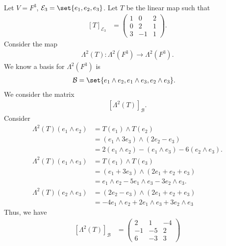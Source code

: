 \documentclass[10pt]{mypackage}
\begin{document}
    \begin{example}
      Let $V = F^3$, $\mathcal{E}_3 = \set{e_1,e_2,e_3}$. Let $T$ be the linear map such that
      \begin{align*}
        \left[T\right]_{\mathcal{E}_3} &= \begin{pmatrix}1 & 0 & 2 \\ 0 & 2 &1 \\ 3 & -1 & 1\end{pmatrix}.
      \end{align*}
      Consider the map
      \begin{align*}
        \Lambda^{2}\left(T\right): \Lambda^{2}\left(F^3\right)\rightarrow \Lambda^{2}\left(F^3\right).
      \end{align*}
      We know a basis for $\Lambda^{2}\left(F^3\right)$ is
      \begin{align*}
        \mathcal{B} &= \set{e_1\wedge e_2,e_1\wedge e_3,e_2\wedge e_3}.
      \end{align*}
      We consider the matrix
      \begin{align*}
        \left[\Lambda^{2}\left(T\right)\right]_{\mathcal{B}}.
      \end{align*}
      Consider
      \begin{align*}
        \Lambda^{2}\left(T\right)\left(e_1\wedge e_2\right) &= T\left(e_1\right)\wedge T\left(e_{2}\right)\\
                                                            &= \left(e_1\wedge 3e_3\right) \wedge \left(2e_2 - e_3\right)\\
                                                            &= 2\left(e_1\wedge e_2\right) - \left(e_1\wedge e_3\right) - 6\left(e_2\wedge e_3\right).\\
        \Lambda^{2}\left(T\right)\left(e_1\wedge e_3\right) &= T\left(e_1\right)\wedge T\left(e_3\right)\\
                                                            &= \left(e_1 + 3e_3\right)\wedge \left(2e_1 + e_2 + e_3\right)\\
                                                            &= e_1\wedge e_2 - 5 e_1\wedge e_3 - 3e_2\wedge e_3.\\
        \Lambda^{2}\left(T\right)\left(e_2\wedge e_3\right) &= \left(2e_2 - e_3\right)\wedge \left(2e_1 + e_2 + e_3\right)\\
                                                            &= -4e_1\wedge e_2 +2e_1\wedge e_3 + 3e_2\wedge e_3
      \end{align*}
      Thus, we have
      \begin{align*}
        \left[\Lambda^{2}\left(T\right)\right]_{\mathcal{B}} &= \begin{pmatrix}2 & 1&-4 \\ -1 & -5&2 \\ 6 &-3 & 3\end{pmatrix}
      \end{align*}
      
    \end{example}
\end{document}
